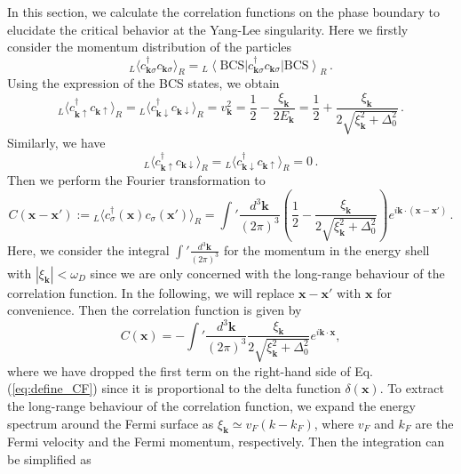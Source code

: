 \documentclass[aps,onecolumn,nofootinbib,superscriptaddress,notitlepage,longbibliography]{revtex4-1}
\begin{document}
In this section, we calculate the correlation functions on the phase boundary to elucidate the critical behavior at the Yang-Lee singularity. Here we firstly consider the momentum distribution of the particles
\begin{equation}
  {}_L\langle c_{\bm{k} \sigma}^{\dagger} c_{\bm{k} \sigma} \rangle_R = {}_L \left\langle
  \text{BCS} \right| c_{\bm{k} \sigma}^{\dagger} c_{\bm{k} \sigma} \left| \text{BCS}\right\rangle_R \,.
\end{equation}
Using the expression of the BCS states, we obtain
\begin{equation}
  {}_L\langle c_{\bm{k} \uparrow}^{\dagger} c_{\bm{k} \uparrow} \rangle_R = {}_L\langle c_{\bm{k}\downarrow}^{\dagger} c_{\bm{k} \downarrow} \rangle_R = v_{\bm{k}}^2 = \frac{1}{2} -
  \frac{\xi_{\bm{k}}}{2 E_{\bm{k}}} = \frac{1}{2} + \frac{\xi_{\bm{k}}}{2 \sqrt{\xi_{\bm{k}}^2 +
  \Delta_0^2}}\,.
\end{equation}
Similarly, we have 
\begin{equation}
  {}_L\langle c_{\bm{k} \uparrow}^{\dagger} c_{\bm{k} \downarrow} \rangle_R = {}_L\langle c_{\bm{k}\downarrow}^{\dagger} c_{\bm{k} \uparrow} \rangle_R = 0\,.
\end{equation}
Then we perform the Fourier transformation to 
\begin{equation}
  C (\bm{x}-\bm{x}') := {}_L\langle c_{\sigma}^{\dagger} (\bm{x}) c_{\sigma} (\bm{x}') \rangle_R = \int ' \frac{d^3 \bm{k}}{(2 \pi)^3} \left(\frac{1}{2} - \frac{\xi_{\bm{k}}}{2 \sqrt{\xi_{\bm{k}}^2 + \Delta_0^2}} \right)e^{i\bm{k} \cdot (\bm{x}-\bm{x}')}\,.
\label{eq:define_CF}
\end{equation}
Here, we consider the integral $\int ' \frac{d^3 \bm{k}}{(2 \pi)^3}$ for the momentum in the energy shell with $|\xi_{\bm{k}}|<\omega_D$ since we are only concerned with the long-range behaviour of the correlation function. 
In the following, we will replace $\bm{x}-\bm{x}'$
with $\bm{x}$ for convenience. Then the correlation
function is given by
\begin{equation}
  C (\bm{x}) = -\int ' \frac{d^3 \bm{k}}{(2 \pi)^3} \frac{\xi_{\bm{k}}}{2 \sqrt{\xi_{\bm{k}}^2
  + \Delta_0^2}} e^{i\bm{k} \cdot \bm{x}},
\end{equation}
where we have dropped the first term on the right-hand side of Eq. (\ref{eq:define_CF}) since it is proportional to the delta function $\delta(\bm{x})$. To extract the long-range behaviour of the correlation function, we expand the energy spectrum around the Fermi surface as $\xi_{\bm{k}} \simeq v_F (k - k_F)$, where $v_F$ and $k_F$ are the Fermi velocity and the Fermi momentum, respectively. Then the integration can be simplified as
\end{document}

